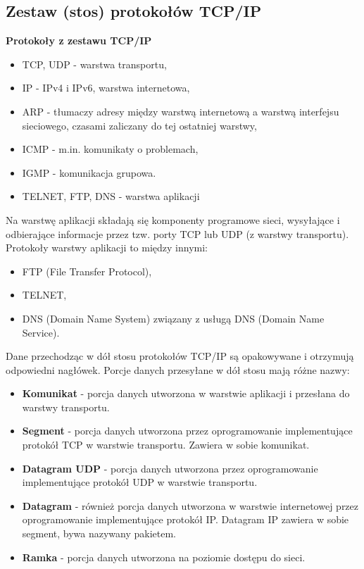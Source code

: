 \documentclass[../main.tex]{subfiles}
\begin{document}
    \subsection{Zestaw (stos) protokołów TCP/IP}

    \textbf{Protokoły z zestawu TCP/IP}
    \begin{itemize}
        \item TCP, UDP - warstwa transportu,
        \item IP - IPv4 i IPv6, warstwa internetowa,
        \item ARP - tłumaczy adresy między warstwą internetową a warstwą interfejsu
        sieciowego, czasami zaliczany do tej ostatniej warstwy,
        \item ICMP - m.in. komunikaty o problemach,
        \item IGMP - komunikacja grupowa.

        \item TELNET, FTP, DNS - warstwa aplikacji
    \end{itemize}

    Na warstwę aplikacji składają się komponenty programowe sieci, wysyłające i odbierające
    informacje przez tzw. porty TCP lub UDP (z warstwy transportu).
    Protokoły warstwy aplikacji to między innymi:
    \begin{itemize}
        \item FTP (File Transfer Protocol),
        \item TELNET,
        \item DNS (Domain Name System) związany z usługą DNS (Domain Name Service).
    \end{itemize}


    Dane przechodząc w dół stosu protokołów TCP/IP są opakowywane i otrzymują
    odpowiedni nagłówek. Porcje danych przesyłane w dół stosu mają różne
    nazwy:
    \begin{itemize}
        \item \textbf{Komunikat} - porcja danych utworzona w warstwie aplikacji i przesłana do warstwy transportu.
        \item \textbf{Segment} - porcja danych utworzona przez oprogramowanie implementujące protokół TCP w warstwie transportu. Zawiera w sobie komunikat.
        \item \textbf{Datagram UDP} - porcja danych utworzona przez oprogramowanie implementujące protokół UDP w warstwie transportu.
        \item \textbf{Datagram} - również porcja danych utworzona w warstwie internetowej przez oprogramowanie implementujące protokół IP. Datagram IP zawiera w sobie segment, bywa nazywany pakietem.
        \item \textbf{Ramka} - porcja danych utworzona na poziomie dostępu do sieci.
    \end{itemize}
\end{document}
